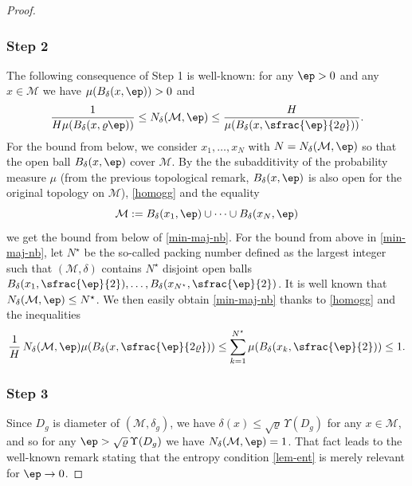 \begin{proof}
\subsubsection*{Step 2} The following consequence of Step 1 is well-known: for any $\ep>0$ and any $x\in\mathcal{M}$ we have $\mu(B_{\delta}(x,\ep))>0$ and
\begin{equation}\label{min-maj-nb}
\frac{1}{H\mu(B_\delta(x,\varrho\ep))} \leq N_\delta(\mathcal{M},\ep) \leq \frac{H}{\mu(B_\delta(x,\sfrac{\ep}{2\varrho}))}.
\end{equation}
For the bound from below, we consider $x_1,\dots,x_N$ with $N=N_\delta(\mathcal{M},\ep)$ so that the open ball $B_{\delta}(x,\ep)$ cover $\mathcal{M}$. By the the subadditivity of the probability measure $\mu$ (from the previous topological remark, $B_\delta(x,\ep)$ is also open for the original topology on $\mathcal{M}$), \eqref{homogg} and the equality
\begin{equation*}
\mathcal{M}:=B_{\delta}(x_1,\ep)\cup\dots \cup B_{\delta}(x_N,\ep)
\end{equation*}
we get the bound from below of \eqref{min-maj-nb}.
For the bound from above in \eqref{min-maj-nb}, let $N^\star$ be the so-called packing number defined as the largest integer such that $(\mathcal{M},\delta)$ contains $N^\star$ disjoint open balls $B_{\delta}(x_1,\sfrac{\ep}{2}),\dots,B_{\delta}(x_{N^\star},\sfrac{\ep}{2})$. It is well known that \hbox{$N_\delta(\mathcal{M},\ep)\leq N^\star$}. We then easily obtain \eqref{min-maj-nb} thanks to \eqref{homogg} and the inequalities
\begin{equation*}
\frac{1}{H}\, N_{\delta}(\mathcal{M},\ep) \mu(B_{\delta}(x,\sfrac{\ep}{2\varrho}))\leq \sum_{k=1}^{N^\star} \mu(B_{\delta}(x_k,\sfrac{\ep}{2})) \leq 1.
\end{equation*}

\subsubsection*{Step 3} Since $D_g$ is diameter of $(\mathcal{M},\delta_g)$, we have
$\delta(x)\leq \sqrt{\varrho}\,\Upsilon(D_g)$ for any $x\in \mathcal{M}$, and so for any $\ep>\sqrt{\varrho}\,\Upsilon(D_g)$ we have $N_\delta(\mathcal{M},\ep)=1$. That fact leads to the well-known remark stating that the entropy condition \eqref{lem-ent} is merely relevant for $\ep\to 0$.


\end{proof}
